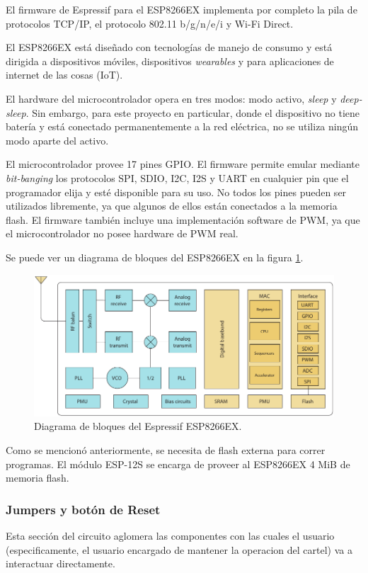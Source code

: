 El firmware de Espressif para el ESP8266EX implementa por completo la pila de protocolos TCP/IP, el protocolo 802.11 b/g/n/e/i y Wi-Fi Direct.

El ESP8266EX está diseñado con tecnologías de manejo de consumo y está dirigida a dispositivos móviles, dispositivos \emph{wearables} y para aplicaciones de internet de las cosas (IoT).

El hardware del microcontrolador opera en tres modos: modo activo, \emph{sleep} y \emph{deep-sleep}. Sin embargo, para este proyecto en particular, donde el dispositivo no tiene batería y está conectado permanentemente a la red eléctrica, no se utiliza ningún modo aparte del activo.

El microcontrolador provee 17 pines GPIO. El firmware permite emular mediante \emph{bit-banging} los protocolos SPI, SDIO, I2C, I2S y UART en cualquier pin que el programador elija y esté disponible para su uso. No todos los pines pueden ser utilizados libremente, ya que algunos de ellos están conectados a la memoria flash. El firmware también incluye una implementación software de PWM, ya que el microcontrolador no posee hardware de PWM real.

Se puede ver un diagrama de bloques del ESP8266EX en la figura \ref{fig:diagrama-bloques-esp8266ex}.

\begin{figure}[htp!]
	\centering
	\includegraphics[width=\linewidth]{imagenes/diagrama-bloques-esp8266.pdf}
	\caption{Diagrama de bloques del Espressif ESP8266EX.}
	\label{fig:diagrama-bloques-esp8266ex}
\end{figure}

Como se mencionó anteriormente, se necesita de flash externa para correr programas. El módulo ESP-12S se encarga de proveer al ESP8266EX 4 MiB de memoria flash.

\subsubsection{Jumpers y botón de Reset} \label{sec:jumpers-rst}
Esta sección del circuito aglomera las componentes con las cuales el usuario (especificamente, el usuario encargado de mantener la operacion del cartel) va a interactuar directamente.

